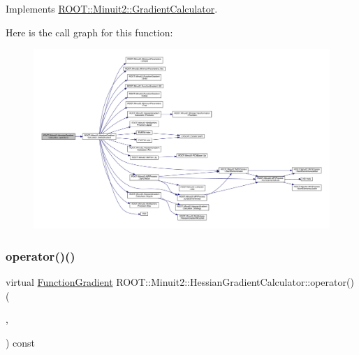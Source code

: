Implements \mbox{\hyperlink{classROOT_1_1Minuit2_1_1GradientCalculator_a1809c1e8a89d32aabf7835e9690c2916}{R\+O\+O\+T\+::\+Minuit2\+::\+Gradient\+Calculator}}.

Here is the call graph for this function\+:
\nopagebreak
\begin{figure}[H]
\begin{center}
\leavevmode
\includegraphics[width=350pt]{dc/d17/classROOT_1_1Minuit2_1_1HessianGradientCalculator_ae8832c265494484c65aed77f023b843f_cgraph}
\end{center}
\end{figure}
\mbox{\label{classROOT_1_1Minuit2_1_1HessianGradientCalculator_af6fed0f29a33ec23f97451562d41cfaa}} 
\subsubsection{\texorpdfstring{operator()()}{operator()()}\hspace{0.1cm}{\footnotesize\ttfamily [6/6]}}
{\footnotesize\ttfamily virtual \mbox{\hyperlink{classROOT_1_1Minuit2_1_1FunctionGradient}{Function\+Gradient}} R\+O\+O\+T\+::\+Minuit2\+::\+Hessian\+Gradient\+Calculator\+::operator() (\begin{DoxyParamCaption}\item[{const \mbox{\hyperlink{classROOT_1_1Minuit2_1_1MinimumParameters}{Minimum\+Parameters}} \&}]{,  }\item[{const \mbox{\hyperlink{classROOT_1_1Minuit2_1_1FunctionGradient}{Function\+Gradient}} \&}]{ }\end{DoxyParamCaption}) const\hspace{0.3cm}{\ttfamily [virtual]}}



